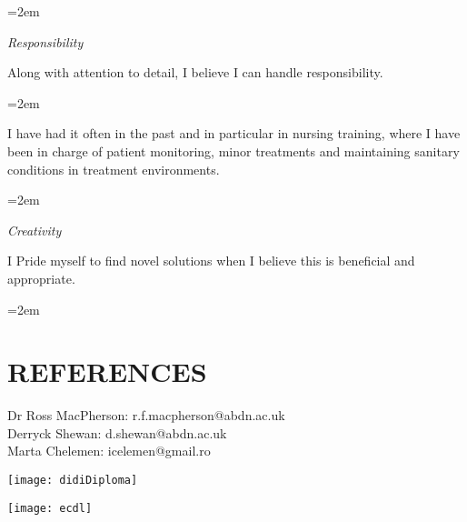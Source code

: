 \documentclass[paper=a4,fontsize=11pt]{scrartcl} %
\newlength{\spacebox}
\newcommand{\sepspace}{\vspace*{1em}}		%
\newcommand{\NewPart}[1]{\section*{\uppercase{#1}}}
\newcommand{\PersonalEntry}[2]{
		\noindent\hangindent=2em\hangafter=0 %
		\parbox{\spacebox}{        %
		\textit{#1}}		       %
		\hspace{1.5em} #2 \par}    %
\newcommand{\SkillsEntry}[2]{      %
		\noindent\hangindent=2em\hangafter=0 %
		\parbox{\spacebox}{        %
		\textit{#1}}			   %
		\hspace{1.5em} \parbox{6\spacebox}{#2} \par}    %
\begin{document}
  \SkillsEntry{Responsibility}{Along with attention to detail, I believe I can handle responsibility. }
  \vspace{3pt}
  \SkillsEntry{}{I have had it often in the past and in particular in nursing training, where  I have been in charge of patient monitoring, minor treatments and maintaining sanitary conditions in treatment environments.}
  \sepspace

  \SkillsEntry{Creativity}{I Pride myself to find novel solutions when I believe this is beneficial and appropriate.}
  \vspace{3pt}
  \SkillsEntry{}{}
  \sepspace

  \NewPart{References}

  Dr Ross MacPherson: r.f.macpherson@abdn.ac.uk \\
  Derryck Shewan: d.shewan@abdn.ac.uk \\
  Marta Chelemen: icelemen@gmail.ro
  
  \texttt{[image: didiDiploma]}

  \cleardoublepage

  \texttt{[image: ecdl]}
  
\end{document}
